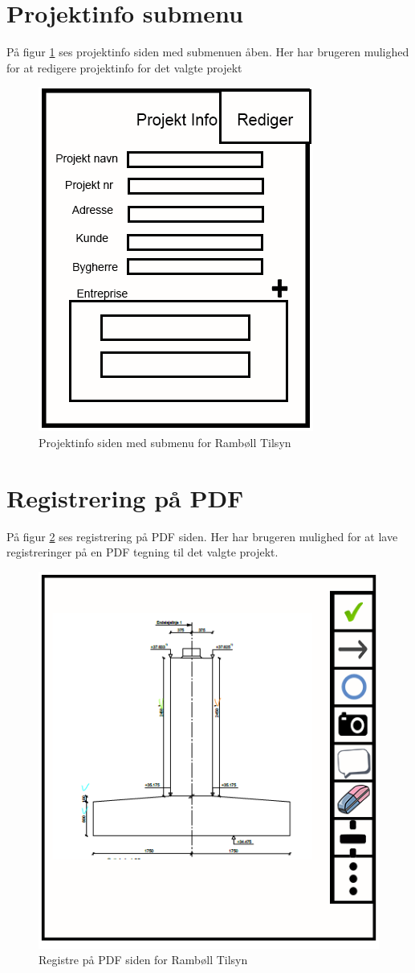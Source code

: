 \section{Projektinfo submenu}\label{sec:ProjektinfoSubMock}
På figur \ref{fig:ProjektinfoSubMock} ses projektinfo siden med submenuen åben. Her har brugeren mulighed for at redigere projektinfo for det valgte projekt

\begin{figure}[H]
	\centering
	\includegraphics[width=0.4\linewidth]{MockUps/Mock/Ramboell-ProjektInfo-Sub}
	\caption{Projektinfo siden med submenu for Rambøll Tilsyn}
	\label{fig:ProjektinfoSubMock}
\end{figure}

\clearpage

\section{Registrering på PDF}\label{sec:RegPaaPDFMock}
På figur \ref{fig:RegPaaPDFMock} ses registrering på PDF siden. Her har brugeren mulighed for at lave registreringer på en PDF tegning til det valgte projekt.

\begin{figure}[H]
	\centering
	\includegraphics[width=0.4\linewidth]{MockUps/Mock/Ramboell-PDF-Reg}
	\caption{Registre på PDF siden for Rambøll Tilsyn}
	\label{fig:RegPaaPDFMock}
\end{figure}


